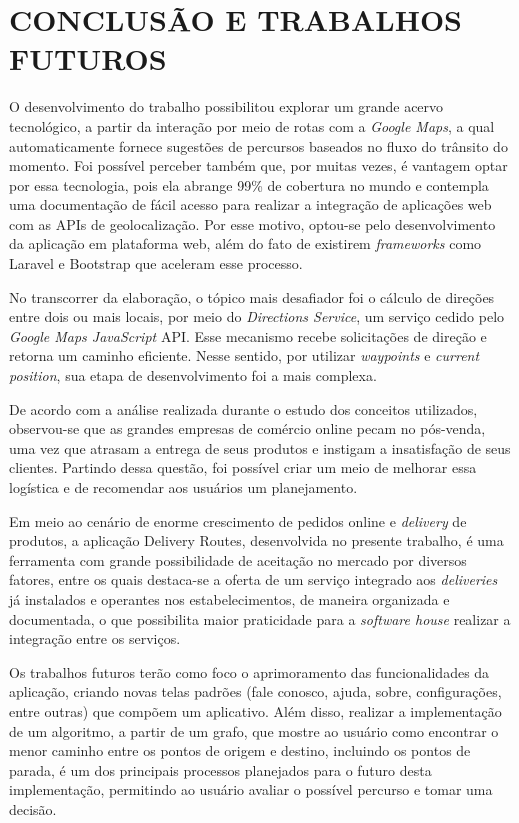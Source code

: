 \chapter{CONCLUSÃO E TRABALHOS FUTUROS}
O desenvolvimento do trabalho possibilitou explorar um grande acervo tecnológico, a partir da interação por meio de rotas com a \textit{Google Maps}, a qual automaticamente fornece sugestões de percursos baseados no fluxo do trânsito do momento. Foi possível perceber também que, por muitas vezes, é vantagem optar por essa tecnologia, pois ela abrange 99\% de cobertura no mundo e contempla uma documentação de fácil acesso para realizar a integração de aplicações web com as APIs de geolocalização. Por esse motivo, optou-se pelo desenvolvimento da aplicação em plataforma web, além do fato de existirem \textit{frameworks} como Laravel e Bootstrap que aceleram esse processo.

No transcorrer da elaboração, o tópico mais desafiador foi o cálculo de direções entre dois ou mais locais, por meio do \textit{Directions Service}, um serviço cedido pelo \textit{Google Maps JavaScript} API. Esse mecanismo recebe solicitações de direção e retorna um caminho eficiente. Nesse sentido, por utilizar \textit{waypoints} e \textit{current position}, sua etapa de desenvolvimento foi a mais complexa.

De acordo com a análise realizada durante o estudo dos conceitos utilizados, observou-se que as grandes empresas de comércio online pecam no pós-venda, uma vez que atrasam a entrega de seus produtos e instigam a insatisfação de seus clientes. Partindo dessa questão, foi possível criar um meio de melhorar essa logística e de recomendar aos usuários um planejamento.

Em meio ao cenário de enorme crescimento de pedidos online e \textit{delivery} de produtos, a aplicação Delivery Routes, desenvolvida no presente trabalho, é uma ferramenta com grande possibilidade de aceitação no mercado por diversos fatores, entre os quais destaca-se a oferta de um serviço integrado aos \textit{deliveries} já instalados e operantes nos estabelecimentos, de maneira organizada e documentada, o que possibilita maior praticidade para a \textit{software house} realizar a integração entre os serviços.


Os trabalhos futuros terão como foco o aprimoramento das funcionalidades da aplicação, criando novas telas padrões (fale conosco, ajuda, sobre, configurações, entre outras) que compõem um aplicativo. 
Além disso, realizar a implementação de um algoritmo, a partir de um grafo, que mostre ao usuário como encontrar o menor caminho entre os pontos de origem e destino, incluindo os pontos de parada, é um dos principais processos planejados para o futuro desta implementação, permitindo ao usuário avaliar o possível percurso e tomar uma decisão. %

